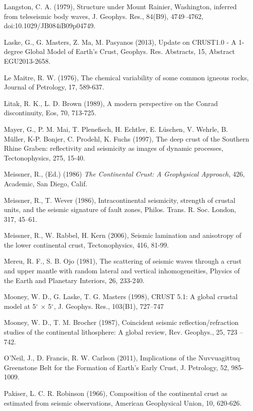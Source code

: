 \documentclass[msc,oneside]{ubcthesis}
\begin{document}
\begin{thebibliography}{1}
\bibitem{} Langston, C. A. (1979), Structure under Mount Rainier, Washington, inferred from teleseismic body waves, J. Geophys. Res., 84(B9), 4749–4762, doi:10.1029/JB084iB09p04749.

\bibitem{} Laske, G., G. Masters, Z. Ma, M. Pasyanos (2013), Update on CRUST1.0 - A 1-degree Global Model of Earth's Crust, Geophys. Res. Abstracts, 15, Abstract EGU2013-2658.

\bibitem{} Le Maitre, R. W. (1976), The chemical variability of some common igneous rocks, Journal of Petrology, 17, 589-637.

\bibitem{} Litak, R. K., L. D. Brown (1989), A modern perspective on the Conrad discontinuity, Eos, 70, 713-725.

\bibitem{} Mayer, G., P. M. Mai, T. Plenefisch, H. Echtler, E. L\"{u}schen, V. Wehrle, B. M\"{u}ller, K-P. Bonjer, C. Prodehl, K. Fuchs (1997), The deep crust of the Southern Rhine Graben: reflectivity and seismicity as images of dynamic processes, Tectonophysics, 275, 15-40.

\bibitem{} Meissner, R., (Ed.) (1986) {\it The Continental Crust: A Geophysical Approach}, 426, Academic, San Diego, Calif.

\bibitem{} Meissner, R., T. Wever (1986), Intracontinental seismicity, strength of crustal units, and the seismic signature of fault zones, Philos. Trans. R. Soc. London, 317, 45–61.

\bibitem{} Meissner, R., W. Rabbel, H. Kern (2006), Seismic lamination and anisotropy of the lower continental crust, Tectonophysics, 416, 81-99.

\bibitem{} Mereu, R. F., S. B. Ojo (1981), The scattering of seismic waves through a crust and upper mantle with random lateral and vertical inhomogeneities, Physics of the Earth and Planetary Interiors, 26, 233-240.

\bibitem{} Mooney, W. D., G. Laske, T. G. Masters (1998), CRUST 5.1: A global crustal model at 5$^\circ$ $\times$ 5$^\circ$, J. Geophys. Res., 103(B1), 727–747

\bibitem{} Mooney, W. D., T. M. Brocher (1987), Coincident seismic reflection/refraction studies of the continental lithosphere: A global review, Rev. Geophys., 25, 723 – 742.

\bibitem{} O'Neil, J., D. Francis, R. W. Carlson (2011), Implications of the Nuvvuagittuq Greenstone Belt for the Formation of Earth’s Early Crust, J. Petrology, 52, 985-1009.

\bibitem{} Pakiser, L. C. R. Robinson (1966), Composition of the continental crust as estimated from seismic observations, American Geophysical Union, 10, 620-626.


\end{thebibliography}
\end{document}
